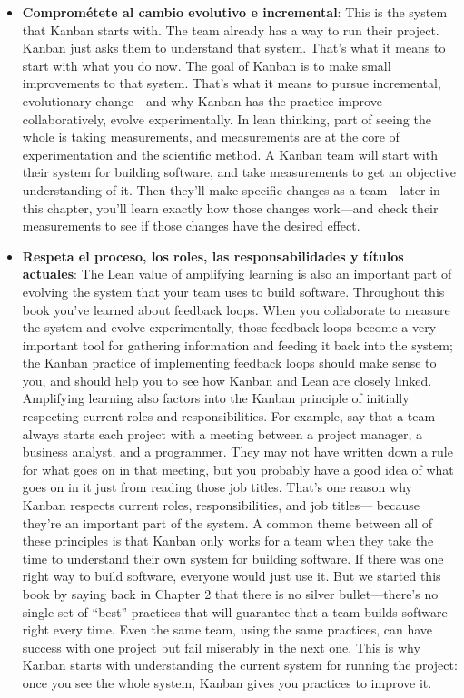 \begin{itemize}
    \item \textbf{Comprométete al cambio evolutivo e incremental}: %
    This is the system that Kanban starts with. The team already has a way to run their
project. Kanban just asks them to understand that system. That's what it means to
start with what you do now. The goal of Kanban is to make small improvements to
that system. That's what it means to pursue incremental, evolutionary change—and
why Kanban has the practice improve collaboratively, evolve experimentally. In
lean thinking, part of seeing the whole is taking measurements, and measurements
are at the core of experimentation and the scientific method. A Kanban team will
start with their system for building software, and take measurements to get an
objective understanding of it. Then they'll make specific changes as a
team—later in this
chapter, you'll learn exactly how those changes work—and check their measurements
to see if those changes have the desired effect.
    \item \textbf{Respeta el proceso, los roles, las responsabilidades y títulos actuales}: %
    The Lean value of amplifying learning is also an important part of evolving the system that your team uses to build software. Throughout this book you've learned
about feedback loops. When you collaborate to measure the system and evolve
experimentally, those feedback loops become a very important tool for gathering
information and feeding it back into the system; the Kanban practice of
implementing feedback loops should make sense to you, and should help you to see
how Kanban and Lean are closely linked.
Amplifying learning also factors into the Kanban principle of initially
respecting current roles and responsibilities. For example, say that a team
always starts each project
with a meeting between a project manager, a business analyst, and a programmer.
They may not have written down a rule for what goes on in that meeting, but you
probably have a good idea of what goes on in it just from reading those job titles.
That's one reason why Kanban respects current roles, responsibilities, and job titles—
because they're an important part of the system.
A common theme between all of these principles is that Kanban only works for a
team when they take the time to understand their own system for building software.
If there was one right way to build software, everyone would just use it. But we
started this book by saying back in Chapter 2 that there is no silver bullet—there's no
single set of “best” practices that will guarantee that a team builds software right every
time. Even the same team, using the same practices, can have success with one project
but fail miserably in the next one. This is why Kanban starts with understanding the
current system for running the project: once you see the whole system, Kanban gives
you practices to improve it.
\end{itemize}

